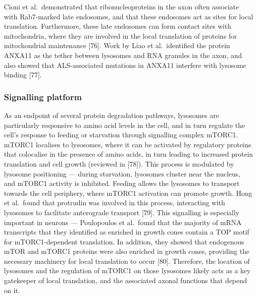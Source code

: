 \documentclass[
  12pt,
  a4paper,
]{book}
\begin{document}
Cioni et al.~demonstrated that ribonucleoproteins in the axon often associate with Rab7-marked late endosomes, and that these endosomes act as sites for local translation. Furthermore, these late endosomes can form contact sites with mitochondria, where they are involved in the local translation of proteins for mitochondrial maintenance {[}76{]}. Work by Liao et al.~identified the protein ANXA11 as the tether between lysosomes and RNA granules in the axon, and also showed that ALS-associated mutations in ANXA11 interfere with lysosome binding {[}77{]}.

\hypertarget{signalling-platform}{%
\subsubsection{Signalling platform}\label{signalling-platform}}

As an endpoint of several protein degradation pathways, lysosomes are particularly responsive to amino acid levels in the cell, and in turn regulate the cell's response to feeding or starvation through signalling complex mTORC1. mTORC1 localises to lysosomes, where it can be activated by regulatory proteins that colocalise in the presence of amino acids, in turn leading to increased protein translation and cell growth (reviewed in {[}78{]}). This process is modulated by lysosome positioning --- during starvation, lysosomes cluster near the nucleus, and mTORC1 activity is inhibited. Feeding allows the lysosomes to transport towards the cell periphery, where mTORC1 activation can promote growth. Hong et al.~found that protrudin was involved in this process, interacting with lysosomes to facilitate anterograde transport {[}79{]}. This signalling is especially important in neurons --- Poulopoulos et al.~found that the majority of mRNA transcripts that they identified as enriched in growth cones contain a TOP motif for mTORC1-dependent translation. In addition, they showed that endogenous mTOR and mTORC1 proteins were also enriched in growth cones, providing the necessary machinery for local translation to occur {[}80{]}. Therefore, the location of lysosomes and the regulation of mTORC1 on those lysosomes likely acts as a key gatekeeper of local translation, and the associated axonal functions that depend on it.
\end{document}

